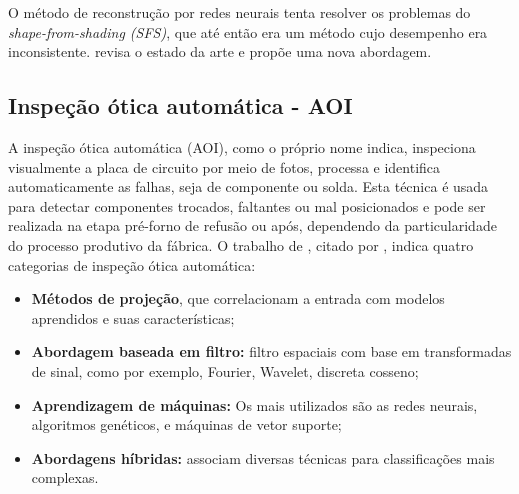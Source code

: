 O método de reconstrução por redes neurais tenta resolver os problemas do \textit{shape-from-shading (SFS)}, que até então era um método cujo desempenho era inconsistente. \cite{5246351} revisa o estado da arte e propõe uma nova abordagem.

\subsection{Inspeção ótica automática - AOI}

A inspeção ótica automática (AOI), como o próprio nome indica, inspeciona visualmente a placa de circuito por meio de fotos, processa e identifica automaticamente as falhas, seja de componente ou solda. Esta técnica é usada para detectar componentes trocados, faltantes ou mal posicionados e pode ser realizada na etapa pré-forno de refusão ou após, dependendo da particularidade do processo produtivo da fábrica. O trabalho de \cite{huang2015automated}, citado por \cite{mello2015sistema}, indica quatro categorias de inspeção ótica automática:

\begin{itemize}
    \item \textbf{Métodos de projeção}, que correlacionam a entrada com modelos aprendidos e suas características;
    \item \textbf{Abordagem baseada em filtro:} filtro espaciais com base em transformadas de sinal, como por exemplo, Fourier, Wavelet, discreta cosseno;
    \item \textbf{Aprendizagem de máquinas:} Os mais utilizados são as redes neurais, algoritmos genéticos, e máquinas de vetor suporte;
    \item \textbf{Abordagens híbridas:} associam diversas técnicas para classificações mais complexas. 
\end{itemize}


